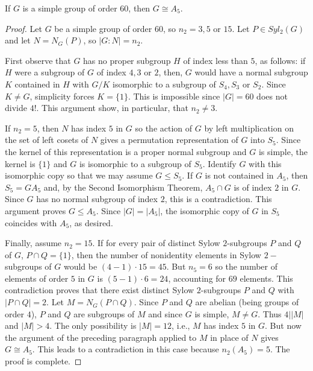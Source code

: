 \documentclass[12pt, a4paper, oneside, openright, titlepage]{book}
\begin{document}
\begin{prop}
    If $G$ is a simple group of order $60$, then $G\cong A_5$.
\end{prop}
\begin{proof}
    Let $G$ be a simple group of order $60$, so $n_2 = 3,5$ or $15$. Let $P \in Syl_2(G)$ and let $N = N_G(P)$, so $|G:N| = n_2$.
    
    First observe that $G$ has no proper subgroup $H$ of index less than $5$, as follows: if $H$ were a subgroup of $G$ of index $4,3$ or $2$, then, $G$ would have a normal subgroup $K$ contained in $H$ with $G/K$ isomorphic to a subgroup of $S_4,S_3$ or $S_2$. Since $K \neq G$, simplicity forces $K = \{1\}$. This is impossible since $|G| = 60$ does not divide $4!$. This argument show, in particular, that $n_2 \neq 3$.

    If $n_2 = 5$, then $N$ has index $5$ in $G$ so the action of $G$ by left multiplication on the set of left cosets of $N$ gives a permutation representation of $G$ into $S_5$. Since the kernel of this representation is a proper normal subgroup and $G$ is simple, the kernel is $\{1\}$ and $G$ is isomorphic to a subgroup of $S_5$. Identify $G$ with this isomorphic copy so that we may assume $G\leq S_5$. If $G$ is not contained in $A_5$, then $S_5 = GA_5$ and, by the Second Isomorphism Theorem, $A_5\cap G$ is of index $2$ in $G$. Since $G$ has no normal subgroup of index $2$, this is a contradiction. This argument proves $G\leq A_5$. Since $|G| = |A_5|$, the isomorphic copy of $G$ in $S_5$ coincides with $A_5$, as desired.

    Finally, assume $n_2 = 15$. If for every pair of distinct Sylow $2$-subgroups $P$ and $Q$ of $G$, $P\cap Q = \{1\}$, then the number of nonidentity elements in Sylow $2-$subgroups of $G$ would be $(4-1)\cdot 15 = 45$. But $n_5 = 6$ so the number of elements of order $5$ in $G$ is $(5-1)\cdot 6 = 24$, accounting for $69$ elements. This contradiction proves that there exist distinct Sylow $2$-subgroups $P$ and $Q$ with $|P\cap Q| = 2$. Let $M = N_G(P\cap Q)$. Since $P$ and $Q$ are abelian (being groups of order $4$), $P$ and $Q$ are subgroups of $M$ and since $G$ is simple, $M \neq G$. Thus $4\vert |M|$ and $|M| > 4$. The only possibility is $|M| = 12$, i.e., $M$ has index $5$ in $G$. But now the argument of the preceding paragraph applied to $M$ in place of $N$ gives $G\cong A_5$. This leads to a contradiction in this case because $n_2(A_5) = 5$. The proof is complete.
\end{proof}
\end{document}

